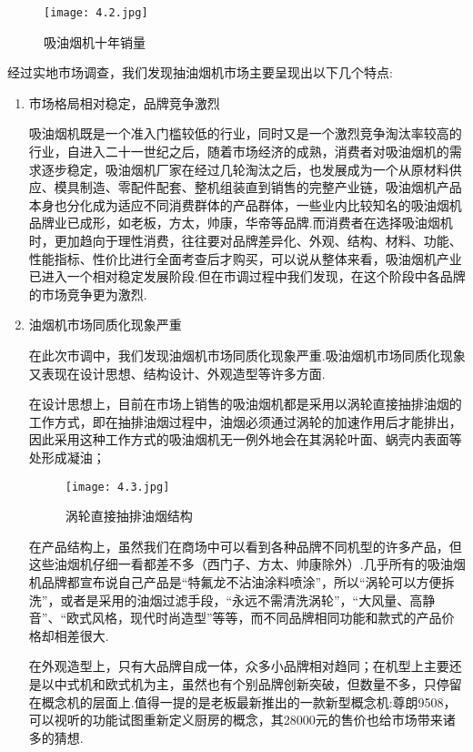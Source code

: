 \begin{figure}[H]
\centering
\texttt{[image: 4.2.jpg]}
\caption{吸油烟机十年销量}
\label{吸油烟机十年销量}
\end{figure}

经过实地市场调查，我们发现抽油烟机市场主要呈现出以下几个特点:

\begin{enumerate}
\item 市场格局相对稳定，品牌竞争激烈

      吸油烟机既是一个准入门槛较低的行业，同时又是一个激烈竞争淘汰率较高的行业，自进入二十一世纪之后，随着市场经济的成熟，消费者对吸油烟机的需求逐步稳定，吸油烟机厂家在经过几轮淘汰之后，也发展成为一个从原材料供应、模具制造、零配件配套、整机组装直到销售的完整产业链，吸油烟机产品本身也分化成为适应不同消费群体的产品群体，一些业内比较知名的吸油烟机品牌业已成形，如老板，方太，帅康，华帝等品牌.而消费者在选择吸油烟机时，更加趋向于理性消费，往往要对品牌差异化、外观、结构、材料、功能、性能指标、性价比进行全面考查后才购买，可以说从整体来看，吸油烟机产业已进入一个相对稳定发展阶段.但在市调过程中我们发现，在这个阶段中各品牌的市场竞争更为激烈.

\item 油烟机市场同质化现象严重

      在此次市调中，我们发现油烟机市场同质化现象严重.吸油烟机市场同质化现象又表现在设计思想、结构设计、外观造型等许多方面.

      在设计思想上，目前在市场上销售的吸油烟机都是采用以涡轮直接抽排油烟的工作方式，即在抽排油烟过程中，油烟必须通过涡轮的加速作用后才能排出，因此采用这种工作方式的吸油烟机无一例外地会在其涡轮叶面、蜗壳内表面等处形成凝油；

      \begin{figure}[H]
      \centering
      \texttt{[image: 4.3.jpg]}
      \caption{涡轮直接抽排油烟结构}
      \label{涡轮直接抽排油烟结构}
      \end{figure}

      在产品结构上，虽然我们在商场中可以看到各种品牌不同机型的许多产品，但这些油烟机仔细一看都差不多（西门子、方太、帅康除外）.几乎所有的吸油烟机品牌都宣布说自己产品是“特氟龙不沾油涂料喷涂”，所以“涡轮可以方便拆洗”，或者是采用的油烟过滤手段，“永远不需清洗涡轮”，“大风量、高静音”、“欧式风格，现代时尚造型”等等，而不同品牌相同功能和款式的产品价格却相差很大.

      在外观造型上，只有大品牌自成一体，众多小品牌相对趋同；在机型上主要还是以中式机和欧式机为主，虽然也有个别品牌创新突破，但数量不多，只停留在概念机的层面上.值得一提的是老板最新推出的一款新型概念机:尊朗9508，可以视听的功能试图重新定义厨房的概念，其28000元的售价也给市场带来诸多的猜想.


\end{enumerate}
